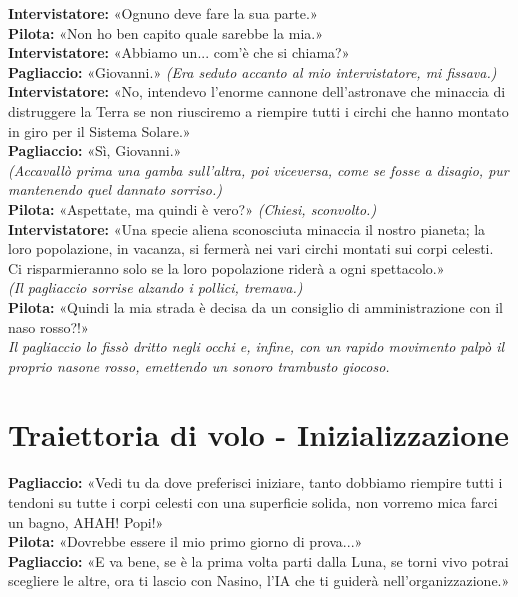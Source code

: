 \documentclass[9pt, twoside]{article}
\begin{document}
\noindent\textbf{Intervistatore:} «Ognuno deve fare la sua parte.» \\
\textbf{Pilota:} «Non ho ben capito quale sarebbe la mia.» \\
\textbf{Intervistatore:} «Abbiamo un... com'è che si chiama?» \\
\textbf{Pagliaccio:} «Giovanni.» \textit{(Era seduto accanto al mio intervistatore, mi fissava.)} \\
\textbf{Intervistatore:} «No, intendevo l'enorme cannone dell'astronave che minaccia di distruggere la Terra se non riusciremo a riempire tutti i circhi che hanno montato in giro per il Sistema Solare.» \\
\textbf{Pagliaccio:} «Sì, Giovanni.» \\ \textit{(Accavallò prima una gamba sull'altra, poi viceversa, come se fosse a disagio, pur mantenendo quel dannato sorriso.)} \\
\textbf{Pilota:} «Aspettate, ma quindi è vero?» \textit{(Chiesi, sconvolto.)} \\
\textbf{Intervistatore:} «Una specie aliena sconosciuta minaccia il nostro pianeta; la loro popolazione, in vacanza, si fermerà nei vari circhi montati sui corpi celesti. Ci risparmieranno solo se la loro popolazione riderà a ogni spettacolo.» \\
\textit{(Il pagliaccio sorrise alzando i pollici, tremava.)} \\
\textbf{Pilota:} «Quindi la mia strada è decisa da un consiglio di amministrazione con il naso rosso?!» \\

\vspace{1mm}
\noindent\textit{Il pagliaccio lo fissò dritto negli occhi e, infine, con un rapido movimento palpò il proprio nasone rosso, emettendo un sonoro trambusto giocoso.} 

\newpage

\section{Traiettoria di volo - Inizializzazione}
\textbf{Pagliaccio:} «Vedi tu da dove preferisci iniziare, tanto dobbiamo riempire tutti i tendoni su tutte i corpi celesti con una superficie solida, non vorremo mica farci un bagno, AHAH! Popi!»  \\
\textbf{Pilota:} «Dovrebbe essere il mio primo giorno di prova...» \\
\textbf{Pagliaccio:} «E va bene, se è la prima volta parti dalla Luna, se torni vivo potrai scegliere le altre, ora ti lascio con Nasino, l'IA che ti guiderà nell'organizzazione.» \\
\end{document}
